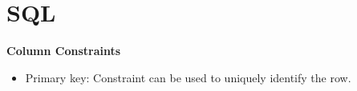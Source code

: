 \section{SQL}


\textbf{Column Constraints}
\begin{itemize}
	\item{Primary key: Constraint can be used to uniquely identify the row.}

\end{itemize}

